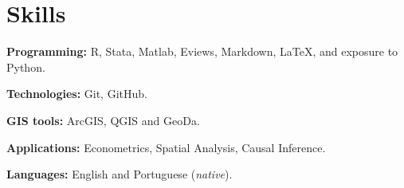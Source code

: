 \documentclass[letterpaper,11pt]{article}
\newcommand{\resumeSubHeadingListStart}{\begin{itemize}[leftmargin=0.15in, label={}]}
\newcommand{\resumeSubHeadingListEnd}{\end{itemize}}
\begin{document}

\section{Skills}
\vspace{2pt}
  
  \resumeSubHeadingListStart
    \small{\item{
        \textbf{Programming:}{ R, Stata, Matlab, Eviews, Markdown, LaTeX, and exposure to Python.} \\ \vspace{3pt}
             
        \textbf{Technologies:}{ Git, GitHub.} \\ \vspace{3pt}

        \textbf{GIS tools:}{ ArcGIS, QGIS and GeoDa.} \\ \vspace{3pt}

        \textbf{Applications:}{ Econometrics, Spatial Analysis, Causal Inference.} \\ \vspace{3pt}
        
        \textbf{Languages:}{ English and Portuguese (\textit{native}).}
        
    }}
  \resumeSubHeadingListEnd



\end{document}
